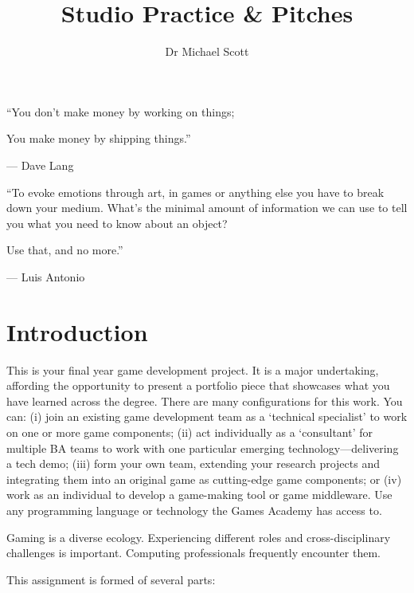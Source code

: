 \documentclass{../../fal_assignment}
\title{Studio Practice \& Pitches}
\author{Dr Michael Scott}
\begin{document}
\maketitle

\begin{marginquote}
    ``You don't make money by working on things;
    
    You make money by shipping things.''
    
    --- Dave Lang
    
    \marginquoterule
    
    ``To evoke emotions through art,
in games or anything else
you have to break down your medium.
What's the minimal amount of information 
we can use to tell you
what you need to know about an object?

Use that, and no more.''
    
    --- Luis Antonio
\end{marginquote}

\section*{Introduction}

This is your final year game development project. It is a major undertaking, affording the opportunity to present a portfolio piece that showcases what you have learned across the degree. There are many configurations for this work. You can: (i) join an existing game development team as a `technical specialist' to work on one or more game components; (ii) act individually as a `consultant' for multiple BA teams to work with one particular emerging technology---delivering a tech demo; (iii) form your own team, extending your research projects and integrating them into an original game as cutting-edge game components; or (iv) work as an individual to develop a game-making tool or game middleware. Use any programming language or technology the Games Academy has access to.

Gaming is a diverse ecology. Experiencing different roles and cross-disciplinary challenges is important. Computing professionals frequently encounter them.

This assignment is formed of several parts:
\end{document}
